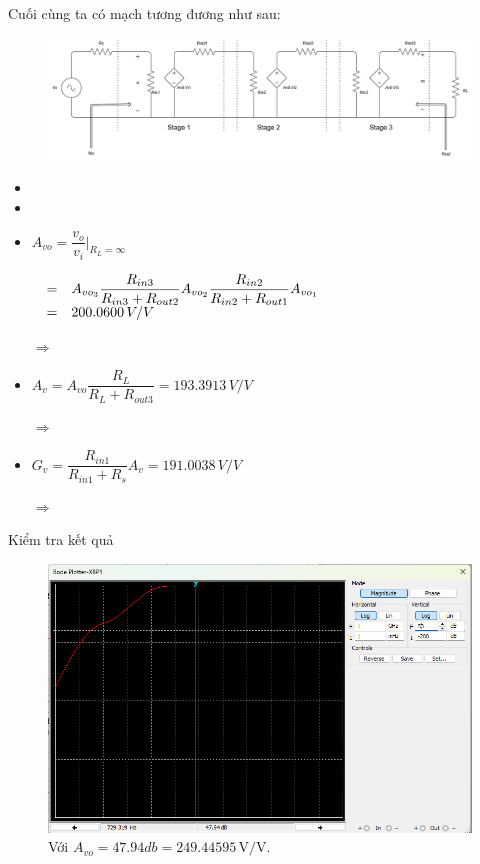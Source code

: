 \noindent Cuối cùng ta có mạch tương đương như sau:

\begin{figure}[H]
	\centering
	\includegraphics[width=.9\linewidth]{./my-chapters/my-diagrams/Question6/caub_1.png}
\end{figure}

\begin{itemize}[label =-]
	\item {}
	\item {}
	\item $A_{vo} = \dfrac{v_{o}}{v_{i}}\bigg|_{R_{L} = \infty}$
	
	$\begin{matrix}
			   & = & A_{vo_{3}} \dfrac{R_{in3}}{R_{in3} + R_{out2}} A_{vo_{2}} \dfrac{R_{in2}}{R_{in2} + R_{out1}}A_{vo_{1}} \hfill\\
			   & = & 200.0600 \, V/V \hfill
	\end{matrix}$
	
	$\Rightarrow$ 

	\item $A_{v} = A_{vo} \dfrac{R_{L}}{R_{L} + R_{out3}} = 193.3913\, V/V$
	
	$\Rightarrow$ 
	\item $G_{v} = \dfrac{R_{in1}}{R_{in1} + R_{s}} A_{v} = 191.0038\, V/V$
	
	$\Rightarrow$ 
\end{itemize}

Kiểm tra kết quả

\begin{figure}[H]
	\centering
	\includegraphics[width=.8\linewidth]{./my-chapters/my-images/Question6/b_bode_A_vo.png}
	\caption{Với $A_{vo} = 47.94db = 249.44595\,\text{V/V}$.}
\end{figure}

